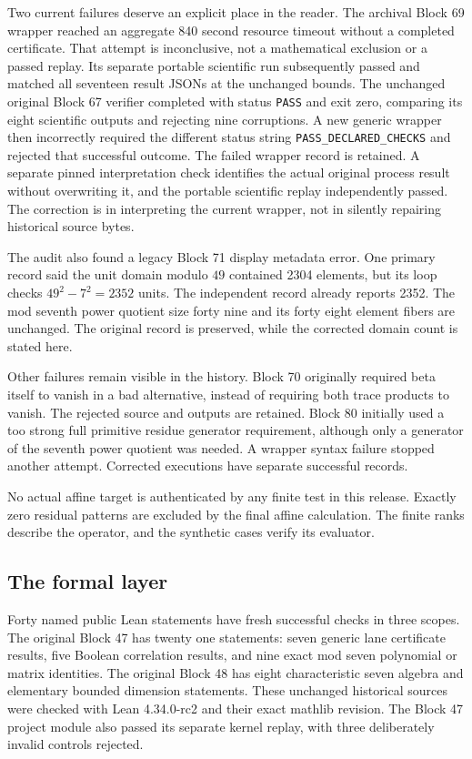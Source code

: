 Two current failures deserve an explicit place in the reader. The archival Block 69 wrapper reached an aggregate 840 second resource timeout without a completed certificate. That attempt is inconclusive, not a mathematical exclusion or a passed replay. Its separate portable scientific run subsequently passed and matched all seventeen result JSONs at the unchanged bounds. The unchanged original Block 67 verifier completed with status \texttt{PASS} and exit zero, comparing its eight scientific outputs and rejecting nine corruptions. A new generic wrapper then incorrectly required the different status string \texttt{PASS\_DECLARED\_CHECKS} and rejected that successful outcome. The failed wrapper record is retained. A separate pinned interpretation check identifies the actual original process result without overwriting it, and the portable scientific replay independently passed. The correction is in interpreting the current wrapper, not in silently repairing historical source bytes.

The audit also found a legacy Block 71 display metadata error. One primary record said the unit domain modulo $49$ contained 2304 elements, but its loop checks $49^2-7^2=2352$ units. The independent record already reports 2352. The mod seventh power quotient size forty nine and its forty eight element fibers are unchanged. The original record is preserved, while the corrected domain count is stated here.

Other failures remain visible in the history. Block 70 originally required beta itself to vanish in a bad alternative, instead of requiring both trace products to vanish. The rejected source and outputs are retained. Block 80 initially used a too strong full primitive residue generator requirement, although only a generator of the seventh power quotient was needed. A wrapper syntax failure stopped another attempt. Corrected executions have separate successful records.

No actual affine target is authenticated by any finite test in this release. Exactly zero residual patterns are excluded by the final affine calculation. The finite ranks describe the operator, and the synthetic cases verify its evaluator.

\subsection{The formal layer}
Forty named public Lean statements have fresh successful checks in three scopes. The original Block 47 has twenty one statements: seven generic lane certificate results, five Boolean correlation results, and nine exact mod seven polynomial or matrix identities. The original Block 48 has eight characteristic seven algebra and elementary bounded dimension statements. These unchanged historical sources were checked with Lean 4.34.0-rc2 and their exact mathlib revision. The Block 47 project module also passed its separate kernel replay, with three deliberately invalid controls rejected.

